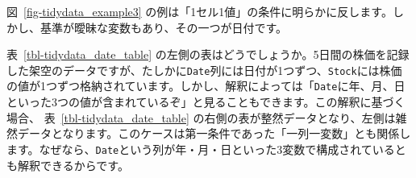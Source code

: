 \documentclass[
  a4paper,
  pandoc,
  ja=standard,
  jafont=haranoaji]{bxjsbook}
\begin{document}
図~\ref{fig-tidydata_example3}
の例は「1セル1値」の条件に明らかに反します。しかし、基準が曖昧な変数もあり、その一つが日付です。

\begin{table}

\caption{\label{tbl-tidydata_date_table}日付の扱い方}\begin{minipage}[t]{0.50\linewidth}

{\centering 


}

\end{minipage}%
%
\begin{minipage}[t]{0.50\linewidth}

{\centering 


}

\end{minipage}%

\end{table}

表~\ref{tbl-tidydata_date_table}
の左側の表はどうでしょうか。5日間の株価を記録した架空のデータですが、たしかに\texttt{Date}列には日付が1つずつ、\texttt{Stock}には株価の値が1つずつ格納されています。しかし、解釈によっては「\texttt{Date}に年、月、日といった3つの値が含まれているぞ」と見ることもできます。この解釈に基づく場合、
表~\ref{tbl-tidydata_date_table}
の右側の表が整然データとなり、左側は雑然データとなります。このケースは第一条件であった「一列一変数」とも関係します。なぜなら、\texttt{Date}という列が年・月・日といった3変数で構成されているとも解釈できるからです。
\end{document}
